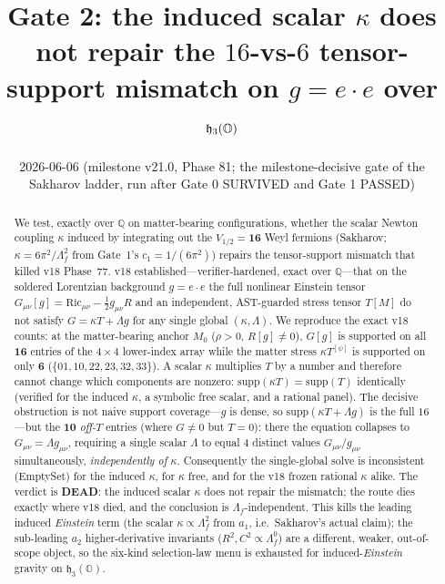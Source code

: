 \documentclass[11pt]{article}
\title{Gate 2: the induced scalar $\kappa$ does not repair the $16$-vs-$6$
tensor-support mismatch on $g=e\!\cdot\!e$ over $\h_3(\Oo)$}
\date{2026-06-06 \quad (milestone v21.0, Phase 81; the milestone-decisive gate of the Sakharov ladder, run after Gate 0 SURVIVED and Gate 1 PASSED)}
\newcommand{\h}{\mathfrak{h}}
\newcommand{\Oo}{\mathbb{O}}
\newcommand{\QQ}{\mathbb{Q}}
\newcommand{\supp}{\mathrm{supp}}
\newcommand{\eu}{e}
\begin{document}
\maketitle

\begin{abstract}
We test, exactly over $\QQ$ on matter-bearing configurations, whether the scalar Newton
coupling $\kappa$ induced by integrating out the $V_{1/2}=\mathbf{16}$ Weyl fermions
(Sakharov; $\kappa=6\pi^2/\Lambda_f^2$ from Gate~1's $c_1=1/(6\pi^2)$) repairs the
tensor-support mismatch that killed v18 Phase~77. v18 established---verifier-hardened, exact
over $\QQ$---that on the soldered Lorentzian background $g=\eu\!\cdot\!\eu$ the full nonlinear
Einstein tensor $G_{\mu\nu}[g]=\mathrm{Ric}_{\mu\nu}-\tfrac12 g_{\mu\nu}R$ and an independent,
AST-guarded stress tensor $T[M]$ do not satisfy $G=\kappa T+\Lambda g$ for any single global
$(\kappa,\Lambda)$. We reproduce the exact v18 counts: at the matter-bearing anchor $M_0$
($\rho>0$, $R[g]\neq0$), $G[g]$ is supported on all $\mathbf{16}$ entries of the $4\times4$
lower-index array while the matter stress $\kappa T^{[\psi]}$ is supported on only $\mathbf{6}$
($\{01,10,22,23,32,33\}$). A scalar $\kappa$ multiplies $T$ by a number and therefore cannot
change which components are nonzero: $\supp(\kappa T)=\supp(T)$ identically (verified for the
induced $\kappa$, a symbolic free scalar, and a rational panel). The decisive obstruction is
not naive support coverage---$g$ is dense, so $\supp(\kappa T+\Lambda g)$ is the full $16$---but
the $\mathbf{10}$ \emph{off-$T$} entries (where $G\neq0$ but $T=0$): there the equation collapses
to $G_{\mu\nu}=\Lambda g_{\mu\nu}$, requiring a single scalar $\Lambda$ to equal $4$ distinct
values $G_{\mu\nu}/g_{\mu\nu}$ simultaneously, \emph{independently of $\kappa$}. Consequently the
single-global solve is inconsistent (\textsf{EmptySet}) for the induced $\kappa$, for $\kappa$
free, and for the v18 frozen rational $\kappa$ alike. The verdict is \textbf{DEAD}: the induced
scalar $\kappa$ does not repair the mismatch; the route dies exactly where v18 died, and the
conclusion is $\Lambda_f$-independent. This kills the leading induced \emph{Einstein} term
(the scalar $\kappa\propto\Lambda_f^2$ from $a_1$, i.e.\ Sakharov's actual claim); the
sub-leading $a_2$ higher-derivative invariants ($R^2,C^2\propto\Lambda_f^0$) are a different,
weaker, out-of-scope object, so the six-kind selection-law menu is exhausted for induced-\emph{Einstein}
gravity on $\h_3(\Oo)$.
\end{abstract}
\end{document}
